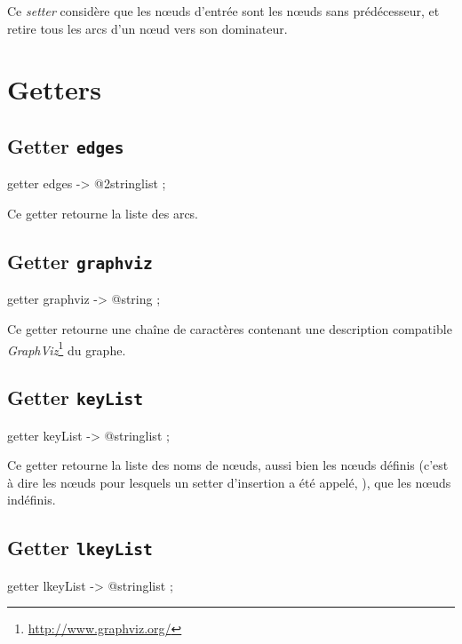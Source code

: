 Ce \emph{setter} considère que les nœuds d'entrée sont les nœuds sans prédécesseur, et retire tous les arcs d'un nœud vers son dominateur.

\section{Getters}

\subsection{Getter \texttt{edges}}

\begin{galgascode}
getter edges -> @2stringlist ;
\end{galgascode}

Ce getter retourne la liste des arcs.


\subsection{Getter \texttt{graphviz}}

\begin{galgascode}
getter graphviz -> @string ;
\end{galgascode}

Ce getter retourne une chaîne de caractères contenant une description compatible \emph{GraphViz}\footnote{\url{http://www.graphviz.org/}} du graphe.


\subsection{Getter \texttt{keyList}}

\begin{galgascode}
getter keyList -> @stringlist ;
\end{galgascode}

Ce getter retourne la liste des noms de nœuds, aussi bien les nœuds définis (c'est à dire les nœuds pour lesquels un setter d'insertion a été appelé, ), que les nœuds indéfinis.



\subsection{Getter \texttt{lkeyList}}

\begin{galgascode}
getter lkeyList -> @stringlist ;
\end{galgascode}

